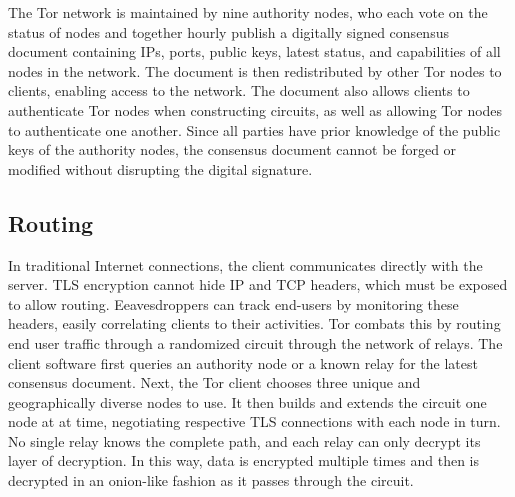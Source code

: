 The Tor network is maintained by nine authority nodes, who each vote on the status of nodes and together hourly publish a digitally signed consensus document containing IPs, ports, public keys, latest status, and capabilities of all nodes in the network. The document is then redistributed by other Tor nodes to clients, enabling access to the network. The document also allows clients to authenticate Tor nodes when constructing circuits, as well as allowing Tor nodes to authenticate one another. Since all parties have prior knowledge of the public keys of the authority nodes, the consensus document cannot be forged or modified without disrupting the digital signature.\cite{Xin2009}

\subsection{Routing}

In traditional Internet connections, the client communicates directly with the server. TLS encryption cannot hide IP and TCP headers, which must be exposed to allow routing. Eeavesdroppers can track end-users by monitoring these headers, easily correlating clients to their activities. Tor combats this by routing end user traffic through a randomized circuit through the network of relays. The client software first queries an authority node or a known relay for the latest consensus document. Next, the Tor client chooses three unique and geographically diverse nodes to use. It then builds and extends the circuit one node at at time, negotiating respective TLS connections with each node in turn. No single relay knows the complete path, and each relay can only decrypt its layer of decryption. In this way, data is encrypted multiple times and then is decrypted in an onion-like fashion as it passes through the circuit.

